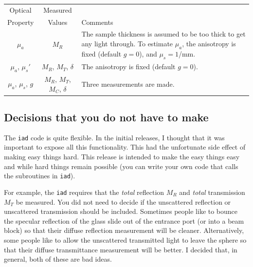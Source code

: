 \documentclass{article}
\newcommand\iadprog{\texttt{iad}}
\begin{document}
\begin{table}[h!]
\begin{center}
\begin{tabular}{c|c|p{7cm}}
 Optical               & Measured                      & \\
 Property              & Values                        & Comments\\
\hline
 $\mu_a$               & $M_R$                         & The sample thickness is assumed to be too thick to get any light through.  To estimate $\mu_a$, the anisotropy is fixed (default $g=0$), and $\mu_s=1$/mm.\\
 $\mu_a$, $\mu_s'$     & $M_R$, $M_T$, $\delta$        & The anisotropy is fixed (default $g=0$).\\
 $\mu_a$, $\mu_s$, $g$ & $M_R$, $M_T$, $M_C$, $\delta$ & Three measurements are made.\\
\end{tabular}
\end{center}
\end{table}


\subsection{Decisions that you do not have to make}

The \iadprog{} code is quite flexible.  In the initial releases, I thought that
it was important to expose all this functionality.  This had the unfortunate
side effect of making easy things hard.  This release is intended to 
make the easy things
easy and while hard things remain possible (you can write your own code
that calls the subroutines in \iadprog{}).

\begin{center}
\end{center}

For example, the \iadprog{} requires that the \textit{total} reflection $M_R$
and \textit{total} transmission $M_T$ be measured.  You 
did not need to decide if the unscattered reflection or unscattered
transmission should be included.  Sometimes people like to bounce the
specular reflection of the glass slide out of the entrance port (or into
a beam block) so that 
their diffuse reflection measurement will be cleaner.  Alternatively, 
some people like to allow the unscattered transmitted light to
leave the sphere so that their diffuse transmittance measurement will be
better.  I decided that, in general, both of these are bad ideas.
\end{document}
